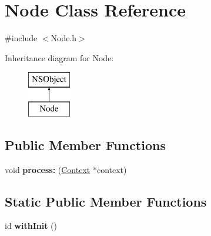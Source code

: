 \hypertarget{interface_node}{
\section{\-Node \-Class \-Reference}
\label{interface_node}
}


{\ttfamily \#include $<$\-Node.\-h$>$}

\-Inheritance diagram for \-Node\-:\begin{figure}[H]
\begin{center}
\leavevmode
\includegraphics[height=2.000000cm]{interface_node}
\end{center}
\end{figure}
\subsection*{\-Public \-Member \-Functions}
\begin{DoxyCompactItemize}
\item 
\hypertarget{interface_node_a0088fa63b54fb309c104ec0ebcbf143c}{
void {\bfseries process\-:} (\hyperlink{interface_context}{\-Context} $\ast$context)}
\label{interface_node_a0088fa63b54fb309c104ec0ebcbf143c}

\end{DoxyCompactItemize}
\subsection*{\-Static \-Public \-Member \-Functions}
\begin{DoxyCompactItemize}
\item 
\hypertarget{interface_node_a97b6612d836a6a9298b09d83c7425e7d}{
id {\bfseries with\-Init} ()}
\label{interface_node_a97b6612d836a6a9298b09d83c7425e7d}

\end{DoxyCompactItemize}
